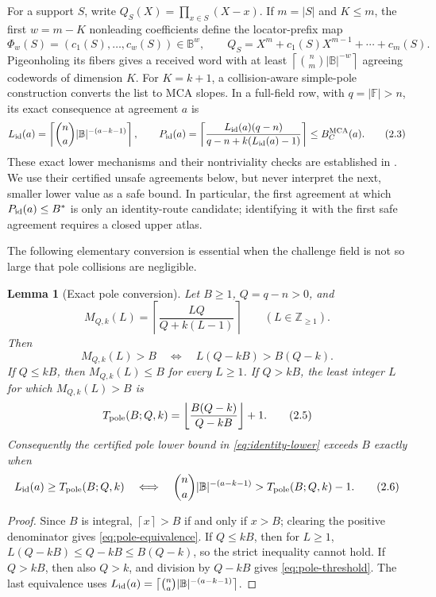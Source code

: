 \documentclass[a4paper,11pt]{amsart}
\newtheorem{lemma}[theorem]{Lemma}
\theoremstyle{remark}
\DeclareMathOperator{\MCA}{MCA}
\newcommand{\F}{\mathbb F}
\newcommand{\B}{\mathbb B}
\newcommand{\abs}[1]{\lvert#1\rvert}
\newcommand{\floor}[1]{\left\lfloor#1\right\rfloor}
\newcommand{\ceil}[1]{\left\lceil#1\right\rceil}
\begin{document}
For a support \(S\), write
\(Q_S(X)=\prod_{x\in S}(X-x)\).  If \(m=\abs S\) and \(K\le m\), the first
\(w=m-K\) nonleading coefficients define the locator-prefix map
\[
 \Phi_w(S)=(c_1(S),\ldots,c_w(S))\in\B^w,
 \qquad Q_S=X^m+c_1(S)X^{m-1}+\cdots+c_m(S).
\]
Pigeonholing its fibers gives a received word with at least
\(\ceil{\binom nm\abs\B^{-w}}\) agreeing codewords of dimension \(K\).
For \(K=k+1\), a collision-aware simple-pole construction converts the list
to MCA slopes.  In a full-field row, with \(q=\abs\F>n\), its exact
consequence at agreement \(a\) is
\[
 L_{\rm id}(a)=\ceil{\binom na\abs{\B}^{-(a-k-1)}},\qquad
 P_{\rm id}(a)=
 \ceil{\frac{L_{\rm id}(a)(q-n)}{q-n+k(L_{\rm id}(a)-1)}}
 \le B_C^{\MCA}(a).                                \tag{2.3}\label{eq:identity-lower}
\]
These exact lower mechanisms and their nontriviality checks
are established in \cite[Proposition~8.1 and Theorem~8.2]{ChoShortening}.  We use their
certified unsafe agreements below, but never interpret the next, smaller
lower value as a safe bound.  In particular, the first agreement at which
\(P_{\rm id}(a)\le B^*\) is only an identity-route candidate; identifying it
with the first safe agreement requires a closed upper atlas.

The following elementary conversion is essential when the challenge field
is not so large that pole collisions are negligible.

\begin{lemma}[Exact pole conversion]\label{lem:exact-pole-conversion}
Let \(B\ge1\), \(Q=q-n>0\), and
\[
 M_{Q,k}(L)=\ceil{\frac{LQ}{Q+k(L-1)}}\qquad(L\in\mathbb Z_{\ge1}).
\]
Then
\[
 M_{Q,k}(L)>B
 \quad\Longleftrightarrow\quad
 L(Q-kB)>B(Q-k).                                  \tag{2.4}\label{eq:pole-equivalence}
\]
If \(Q\le kB\), then \(M_{Q,k}(L)\le B\) for every \(L\ge1\).  If
\(Q>kB\), the least integer \(L\) for which \(M_{Q,k}(L)>B\) is
\[
 T_{\rm pole}(B;Q,k)
 =\floor{\frac{B(Q-k)}{Q-kB}}+1.                 \tag{2.5}\label{eq:pole-threshold}
\]
Consequently the certified pole lower bound in \eqref{eq:identity-lower}
exceeds \(B\) exactly when
\[
 L_{\rm id}(a)\ge T_{\rm pole}(B;Q,k)
 \quad\Longleftrightarrow\quad
 \binom na\abs{\B}^{-(a-k-1)}>T_{\rm pole}(B;Q,k)-1. \tag{2.6}\label{eq:exact-pole-mean}
\]
\end{lemma}

\begin{proof}
Since \(B\) is integral, \(\ceil{x}>B\) if and only if \(x>B\); clearing
the positive denominator gives \eqref{eq:pole-equivalence}.  If
\(Q\le kB\), then for \(L\ge1\),
\(L(Q-kB)\le Q-kB\le B(Q-k)\), so the strict inequality cannot hold.
If \(Q>kB\), then also \(Q>k\), and division by \(Q-kB\) gives
\eqref{eq:pole-threshold}.  The last equivalence uses
\(L_{\rm id}(a)=\ceil{\binom na\abs{\B}^{-(a-k-1)}}\).
\end{proof}
\end{document}
